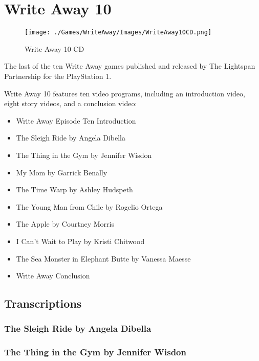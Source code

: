 \chapter{Write Away 10}

\begin{figure}[H]
    \centering
    \texttt{[image: ./Games/WriteAway/Images/WriteAway10CD.png]}
    \caption{Write Away 10 CD}
\end{figure}

The last of the ten Write Away games published and released by The Lightspan Partnership for the PlayStation 1.

Write Away 10 features ten video programs, including an introduction video, eight story videos, and a conclusion video:

\begin{itemize}
    \item Write Away Episode Ten Introduction
    \item The Sleigh Ride by Angela Dibella
    \item The Thing in the Gym by Jennifer Wisdon
    \item My Mom by Garrick Benally
    \item The Time Warp by Ashley Hudspeth
    \item The Young Man from Chile by Rogelio Ortega
    \item The Apple by Courtney Morris
    \item I Can't Wait to Play by Kristi Chitwood
    \item The Sea Monster in Elephant Butte by Vanessa Maesse
    \item Write Away Conclusion
\end{itemize}

\clearpage
\newpage

\section{Transcriptions}

\subsection{The Sleigh Ride by Angela Dibella}

\subsection{The Thing in the Gym by Jennifer Wisdon}

